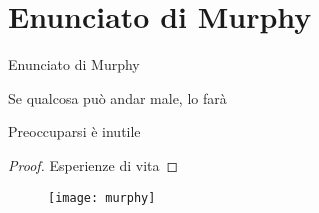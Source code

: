 \section{Enunciato di Murphy}
  \begin{frame}{Enunciato di Murphy}

	\begin{teoremaMurphy} Se qualcosa può andar male, lo farà \end{teoremaMurphy}
	\begin{corollarioMurphy} Preoccuparsi è inutile \end{corollarioMurphy}
	\begin{proof} Esperienze di vita \end{proof} %

	\begin{figure}[h!]
	\texttt{[image: murphy]}
	\end{figure}

\end{frame}
